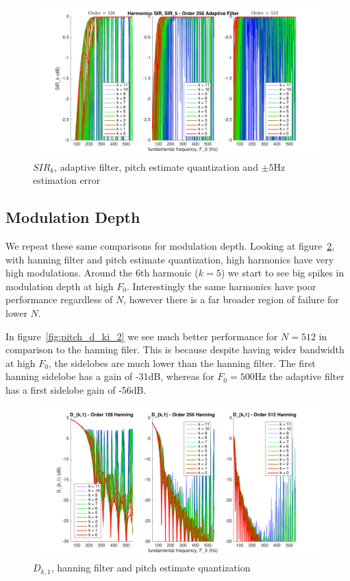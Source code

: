 \documentclass [11pt, proquest,oneside] {ganter_thesis}[2015/03/03]
\begin{document}
\begin{figure}[!ht]
  \centering
    \includegraphics[width=1\textwidth]{pitch_sir_k_2_error5}
    \caption{$SIR_k$, adaptive filter, pitch estimate quantization and $\pm5$Hz estimation error}\label{fig:pitch_sir_k_2_error5}
\end{figure}

\clearpage

\subsection{Modulation Depth}

We repeat these same comparisons for modulation depth.  Looking at figure~\ref{fig:pitch_d_ki_1}, with hanning filter and pitch estimate quantization, high harmonics have very high modulations.  Around the 6th harmonic ($k = 5$) we start to see big spikes in modulation depth at high $F_0$.  Interestingly the same harmonics have poor performance regardless of $N$, however there is a far broader region of failure for lower $N$.

In  figure~\ref{fig:pitch_d_ki_2} we see much better performance for $N = 512$ in comparison to the hanning filer.  This is because despite having wider bandwidth at high $F_0$, the sidelobes are much lower than the hanning filter.  The first hanning sidelobe has a gain of -31dB, whereas for $F_0 = 500$Hz the adaptive filter has a first sidelobe gain of -56dB.

\begin{figure}[!ht]
  \centering
    \includegraphics[width=1\textwidth]{pitch_d_ki_1}
    \caption{$D_{k,1}$, hanning filter and pitch estimate quantization}\label{fig:pitch_d_ki_1}
\end{figure}
\end{document}
